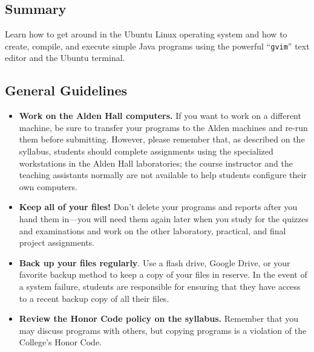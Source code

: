 



\subsection*{Summary}

Learn how to get around in the Ubuntu Linux operating system and how to create, compile, and execute simple Java
programs using the powerful ``{\tt gvim}'' text editor and the Ubuntu terminal.

\vspace*{-.1in}
\subsection*{General Guidelines}

\begin{itemize}
  \setlength{\itemsep}{0pt}

  \item {\bf Work on the Alden Hall computers.} If you want to work on a different machine, be sure to transfer your
    programs to the Alden machines and re-run them before submitting. However, please remember that, as described on the
    syllabus, students should complete assignments using the specialized workstations in the Alden Hall laboratories;
    the course instructor and the teaching assistants normally are not available to help students configure their own
    computers.

  \item {\bf Keep all of your files!} Don't delete your programs and reports after you hand them in---you will need
    them again later when you study for the quizzes and examinations and work on the other laboratory, practical, and
    final project assignments.

  \item {\bf Back up your files regularly}. Use a flash drive, Google Drive, or your favorite backup method to keep a
    copy of your files in reserve. In the event of a system failure, students are responsible for ensuring that they
    have access to a recent backup copy of all their files.

  \item {\bf Review the Honor Code policy on the syllabus.} Remember that you may discuss programs with others, but
    copying programs is a violation of the College's Honor Code.

\end{itemize}

